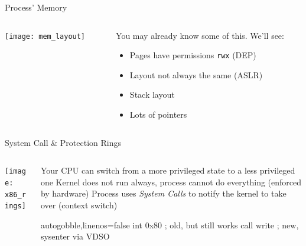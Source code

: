 \documentclass[beamer]{uibk}
\begin{document}
\begin{frame}{Process' Memory}
    \begin{columns}
        \begin{column}{0.5\textwidth}
            \begin{center}
                \texttt{[image: mem\_layout]}
            \end{center}
        \end{column}
        \begin{column}{0.5\textwidth}
            You may already know some of this.
            \bigskip
            We'll see:
            \begin{itemize}
                \item Pages have permissions \texttt{rwx} (DEP)
                \item Layout not always the same (ASLR)
                \item Stack layout
                \item Lots of pointers
            \end{itemize}
        \end{column}
    \end{columns}
\end{frame}

\begin{frame}[fragile]{System Call \& Protection Rings}
    \begin{columns}
        \begin{column}{0.55\textwidth}
            \texttt{[image: x86\_rings]}
        \end{column}
        \begin{column}{0.45\textwidth}
            Your CPU can switch from a more privileged state to a less
            privileged one
            \bigskip
            Kernel does not run always, process cannot do everything (enforced
            by hardware)
            \bigskip
            Process uses \emph{System Calls} to notify the kernel to take over
            (context switch)
            \medskip
            \begin{nasmcode*}{autogobble,linenos=false}
                int   0x80   ; old, but still works
                call  write  ; new, sysenter via VDSO
            \end{nasmcode*}
        \end{column}
    \end{columns}
\end{frame}
\end{document}
